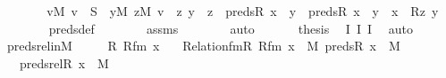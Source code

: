\begin{isabellebody}
\ \ \ \ \isamarkupfalse%
\ \isamarkupfalse%
\ {\isachardoublequoteopen}{\isasymforall}v{\isasymin}M{\isachardot}{\kern0pt}\ v\ {\isasymin}\ S\ {\isasymlongleftrightarrow}\ {\isacharparenleft}{\kern0pt}{\isasymexists}y{\isasymin}M{\isachardot}{\kern0pt}\ {\isasymexists}z{\isasymin}M{\isachardot}{\kern0pt}\ v\ {\isacharequal}{\kern0pt}\ {\isasymlangle}z{\isacharcomma}{\kern0pt}\ y{\isasymrangle}\ {\isasymand}\ z\ {\isasymin}\ preds{\isacharparenleft}{\kern0pt}R{\isacharcomma}{\kern0pt}\ x{\isacharparenright}{\kern0pt}\ {\isasymand}\ {\isacharparenleft}{\kern0pt}y\ {\isasymin}\ preds{\isacharparenleft}{\kern0pt}R{\isacharcomma}{\kern0pt}\ x{\isacharparenright}{\kern0pt}\ {\isasymor}\ y\ {\isacharequal}{\kern0pt}\ x{\isacharparenright}{\kern0pt}\ {\isasymand}\ R{\isacharparenleft}{\kern0pt}z{\isacharcomma}{\kern0pt}\ y{\isacharparenright}{\kern0pt}{\isacharparenright}{\kern0pt}{\isachardoublequoteclose}\ \isanewline
\ \ \ \ \ \ \isamarkupfalse%
\ preds{\isacharunderscore}{\kern0pt}def\isanewline
\ \ \ \ \ \ \isamarkupfalse%
\ assms\isanewline
\ \ \ \ \ \ \isamarkupfalse%
\ auto\isanewline
\ \ \isamarkupfalse%
\isanewline
\isanewline
\ \ \isamarkupfalse%
\ {\isacharquery}{\kern0pt}thesis\ \isamarkupfalse%
\ I{}\ I{}\ I{}\ \isamarkupfalse%
\ auto\isanewline
{}\isamarkupfalse%
%
\endisatagproof
{\isafoldproof}%
%
\isadelimproof
\isanewline
%
\endisadelimproof
\isanewline
{}\isamarkupfalse%
\ preds{\isacharunderscore}{\kern0pt}rel{\isacharunderscore}{\kern0pt}in{\isacharunderscore}{\kern0pt}M\ {\isacharcolon}{\kern0pt}\ \isanewline
\ \ \ R\ Rfm\ x\isanewline
\ \ \ {\isachardoublequoteopen}Relation{\isacharunderscore}{\kern0pt}fm{\isacharparenleft}{\kern0pt}R{\isacharcomma}{\kern0pt}\ Rfm{\isacharparenright}{\kern0pt}{\isachardoublequoteclose}\ {\isachardoublequoteopen}x\ {\isasymin}\ M{\isachardoublequoteclose}\ {\isachardoublequoteopen}preds{\isacharparenleft}{\kern0pt}R{\isacharcomma}{\kern0pt}\ x{\isacharparenright}{\kern0pt}\ {\isasymin}\ M{\isachardoublequoteclose}\isanewline
\ \ \ {\isachardoublequoteopen}preds{\isacharunderscore}{\kern0pt}rel{\isacharparenleft}{\kern0pt}R{\isacharcomma}{\kern0pt}\ x{\isacharparenright}{\kern0pt}\ {\isasymin}\ M{\isachardoublequoteclose}\isanewline
%
\isadelimproof
%
\endisadelimproof
%
\isatagproof
{}\isamarkupfalse%
\ {\isacharminus}{\kern0pt}\ \isanewline

\end{isabellebody}

